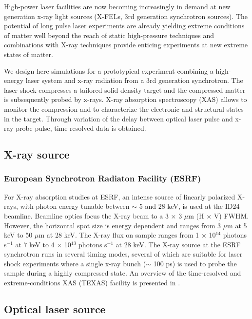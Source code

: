 \documentclass[a4paper]{article}
\begin{document}
High-power  laser facilities are now becoming increasingly in demand at new
generation x-ray light sources (X-FELs, 3rd generation synchrotron sources). The potential of long pulse laser experiments are already yielding extreme conditions of matter well beyond the reach of static high-pressure techniques and combinations with X-ray techniques provide enticing experiments at new extreme states of matter.

We design here simulations for a prototypical experiment combining a high-energy laser system and x-ray radiation
from a 3rd generation synchrotron. The laser shock-compresses a tailored solid density target and the compressed
matter is subsequently probed by x-rays. X-ray absorption spectroscopy (XAS) allows to monitor the compression and
to characterize the electronic and structural states in the target. Through variation of the delay between optical
laser pulse and x-ray probe pulse, time resolved data is obtained.

\subsection{X-ray source}
\subsubsection{European Synchrotron Radiaton Facility (ESRF)}
For X-ray absorption studies at ESRF, an intense source of linearly polarized X-rays, with photon energy tunable
between $\sim$ 5 and 28 keV, is used at the ID24 beamline. Beamline optics focus the X-ray beam to a 3 $\times$ 3
$\mu$m (H $\times$ V) FWHM. However, the horizontal spot size is energy dependent and ranges from 3 $\mu$m at 5 keV
to 50 $\mu$m at 28 keV. The X-ray flux on sample ranges from 1 $\times$ 10$^{14}$ photons s$^{-1}$ at 7 keV to 4
$\times$ 10$^{13}$ photons s$^{-1}$ at 28 keV. The X-ray source at the ESRF synchrotron runs in several timing
modes, several of which are suitable for laser shock experiments where a single x-ray bunch ($\sim$ 100 ps) is used
to probe the sample during a highly compressed state. An overview of the time-resolved and extreme-conditions XAS
(TEXAS) facility is presented in \cite{Pascarelli2016}.
\subsection{Optical laser source}
\end{document}
